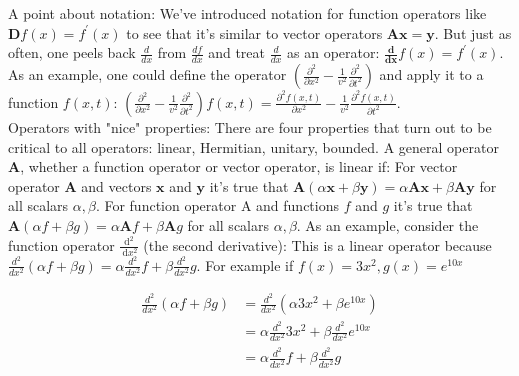 \documentclass[main.tex]{subfiles}
\begin{document}
A point about notation: We've introduced notation for function operators like $\mathbf{D} f(x)=f^{\prime}(x)$ to see that it's similar to vector operators $\mathbf{A} \mathbf{x}=\mathbf{y}$. But just as often, one peels back $\frac{d}{d x}$ from $\frac{d f}{d x}$ and treat $\frac{d}{d x}$ as an operator: $\frac{\mathbf{d}}{\mathbf{d x}} f(x)=f^{\prime}(x)$. As an example, one could define the operator $\left(\frac{\partial^{2}}{\partial x^{2}}-\frac{1}{v^{2}} \frac{\partial^{2}}{\partial t^{2}}\right)$ and apply it to a function $f(x, t)$: $\left(\frac{\partial^{2}}{\partial x^{2}}-\frac{1}{v^{2}} \frac{\partial^{2}}{\partial t^{2}}\right) f(x, t)=\frac{\partial^{2} f(x, t)}{\partial x^{2}}-\frac{1}{v^{2}} \frac{\partial^{2} f(x, t)}{\partial t^{2}}$.\\

Operators with "nice" properties: There are four properties that turn out to be critical to all operators: linear, Hermitian, unitary, bounded. A general operator $\mathbf{A}$, whether a function operator or vector operator, is linear if: For vector operator $\mathbf{A}$ and vectors $\mathbf{x}$ and $\mathbf{y}$ it's true that $\mathbf{A}(\alpha \mathbf{x}+\beta \mathbf{y})=\alpha \mathbf{A x}+\beta \mathbf{A} \mathbf{y}$ for all scalars $\alpha, \beta$. For function operator A and functions $f$ and $g$ it's true that $\mathbf{A}(\alpha f+\beta g)=\alpha \mathbf{A} f+\beta \mathbf{A} g$ for all scalars $\alpha, \beta$. As an example, consider the function operator $\frac{\mathrm{d}^{2}}{\mathrm{~d} x^{2}}$ (the second derivative): This is a linear operator because $\frac{d^{2}}{d x^{2}}(\alpha f+\beta g)=\alpha \frac{d^{2}}{d x^{2}} f+\beta \frac{d^{2}}{d x^{2}} g$. For example if $f(x)=3 x^{2}, g(x)=e^{10 x}$

$$
\begin{aligned}
\frac{d^{2}}{d x^{2}}(\alpha f+\beta g) &=\frac{d^{2}}{d x^{2}}\left(\alpha 3 x^{2}+\beta e^{10 x}\right) \\
&=\alpha \frac{d^{2}}{d x^{2}} 3 x^{2}+\beta \frac{d^{2}}{d x^{2}} e^{10 x} \\
&=\alpha \frac{d^{2}}{d x^{2}} f+\beta \frac{d^{2}}{d x^{2}} g
\end{aligned}
$$
\end{document}
